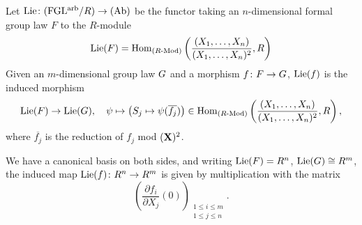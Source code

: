 \documentclass[../main.tex]{subfiles}
\begin{document}
\begin{defi}
Let $\operatorname{Lie}\colon {(\mathrm{FGL^{arb}}/{R})} \to {(\mathrm{Ab})}$ be the functor taking an $n$-dimensional 
formal group law $F$ to the $R$-module
\begin{equation*}
  \operatorname{Lie}({F}) = \operatorname{Hom}_{{({R}\text-\allowbreak\mathrm{Mod})}} \left( \frac{(X_1, \dots, X_n)}{(X_1, \dots,
  X_n)^2}, R \right) 
\end{equation*}
Given an $m$-dimensional group law ${G}$ and a morphism ${f}\colon {F} \to
{G}$, $\operatorname{Lie}({f})$ is the induced morphism
\begin{equation*}
  \operatorname{Lie}({F}) \to \operatorname{Lie}({G}), \quad \psi \mapsto \left( S_j \mapsto \psi
  (\overline{f_j})\right) \in 
  \operatorname{Hom}_{({R}\text-\allowbreak\mathrm{Mod})}\left(\frac{(X_1, \dots, X_n)}{(X_1, \dots, X_n)^2}, R \right),
\end{equation*}
where $\overline{ f_j}$ is the reduction of $f_j$ mod $(\mathbf{X})^2$. 
\end{defi}
We have a canonical basis on both sides, and writing $\operatorname{Lie}({F}) = R^n$, 
$\operatorname{Lie}({G}) \cong R^m$, the induced map $\operatorname{Lie}({f}) \colon R^n \to R^m$ is
given by multiplication with the matrix 
\begin{equation*}
  \left( \frac {\partial f_i}{\partial X_j} (0) \right)_{\substack{1 \leq i \leq m \\ 1 \leq j \leq n}}.
\end{equation*}
\end{document}

